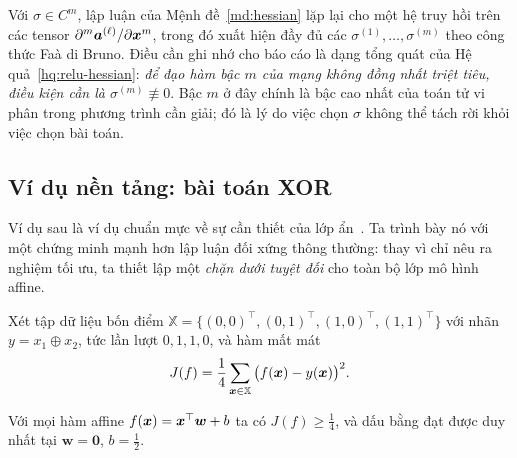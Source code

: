 \begin{nhanxet}
\label{nx:bac-cao}
Với $\sigma \in C^{m}$, lập luận của Mệnh đề~\ref{md:hessian} lặp lại cho một hệ
truy hồi trên các tensor $\partial^{m}\bm{a}^{(\ell)}/\partial\bm{x}^{m}$, trong đó
xuất hiện đầy đủ các $\sigma^{(1)},\dots,\sigma^{(m)}$ theo công thức Faà di
Bruno. Điều cần ghi nhớ cho báo cáo là dạng tổng quát của Hệ
quả~\ref{hq:relu-hessian}: \emph{để đạo hàm bậc $m$ của mạng không đồng nhất
triệt tiêu, điều kiện cần là $\sigma^{(m)} \not\equiv 0$}. Bậc $m$ ở đây chính
là bậc cao nhất của toán tử vi phân trong phương trình cần giải; đó là lý do
việc chọn $\sigma$ không thể tách rời khỏi việc chọn bài toán.
\end{nhanxet}
 
\subsection{Ví dụ nền tảng: bài toán XOR}
\label{subsec:xor}
 
Ví dụ sau là ví dụ chuẩn mực về sự cần thiết của lớp ẩn~\cite{goodfellow2016}.
Ta trình bày nó với một chứng minh mạnh hơn lập luận đối xứng thông thường: thay
vì chỉ nêu ra nghiệm tối ưu, ta thiết lập một \emph{chặn dưới tuyệt đối} cho
toàn bộ lớp mô hình affine.
 
Xét tập dữ liệu bốn điểm
$\mathbb{X} = \{(0,0)^{\top},(0,1)^{\top},(1,0)^{\top},(1,1)^{\top}\}$ với nhãn
$y = x_1 \oplus x_2$, tức lần lượt $0,1,1,0$, và hàm mất mát
\begin{equation}
J(f) = \frac{1}{4} \sum_{\bm{x} \in \mathbb{X}}
  \big( f(\bm{x}) - y(\bm{x}) \big)^2 .
\label{eq:xor-loss}
\end{equation}
 
\begin{menhde}
\label{md:xor-chan-duoi}
Với mọi hàm affine $f(\bm{x}) = \bm{x}^{\top}\bm{w} + b$ ta có $J(f) \ge \tfrac14$, và
dấu bằng đạt được duy nhất tại $\bm{w} = \bm{0}$, $b = \tfrac12$.
\end{menhde}
 
